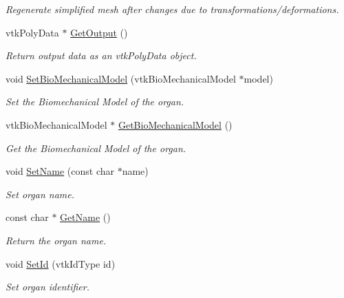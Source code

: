 \begin{DoxyCompactItemize}
\begin{DoxyCompactList}\small\item\em Regenerate simplified mesh after changes due to transformations/deformations. \item\end{DoxyCompactList}\item 
vtkPolyData $\ast$ \hyperlink{classvtkOrgan_a12141c47bba12d71e1b7d3c02d398f89}{GetOutput} ()
\begin{DoxyCompactList}\small\item\em Return output data as an vtkPolyData object. \item\end{DoxyCompactList}\item 
void \hyperlink{classvtkOrgan_ad163fb8b19cb52cf99eb350512945510}{SetBioMechanicalModel} (vtkBioMechanicalModel $\ast$model)
\begin{DoxyCompactList}\small\item\em Set the Biomechanical Model of the organ. \item\end{DoxyCompactList}\item 
vtkBioMechanicalModel $\ast$ \hyperlink{classvtkOrgan_a557162900b7880dac34acca512bcebd0}{GetBioMechanicalModel} ()
\begin{DoxyCompactList}\small\item\em Get the Biomechanical Model of the organ. \item\end{DoxyCompactList}\item 
void \hyperlink{classvtkOrgan_a55ca17e15fea6a6c1672f8b271546e6b}{SetName} (const char $\ast$name)
\begin{DoxyCompactList}\small\item\em Set organ name. \item\end{DoxyCompactList}\item 
const char $\ast$ \hyperlink{classvtkOrgan_a8421389b02b00b42b0899b75d00633b4}{GetName} ()
\begin{DoxyCompactList}\small\item\em Return the organ name. \item\end{DoxyCompactList}\item 
void \hyperlink{classvtkOrgan_a0aab831b4e0a9d33ba961a0907b73e80}{SetId} (vtkIdType id)
\begin{DoxyCompactList}\small\item\em Set organ identifier. \item\end{DoxyCompactList}\item 

\end{DoxyCompactItemize}
